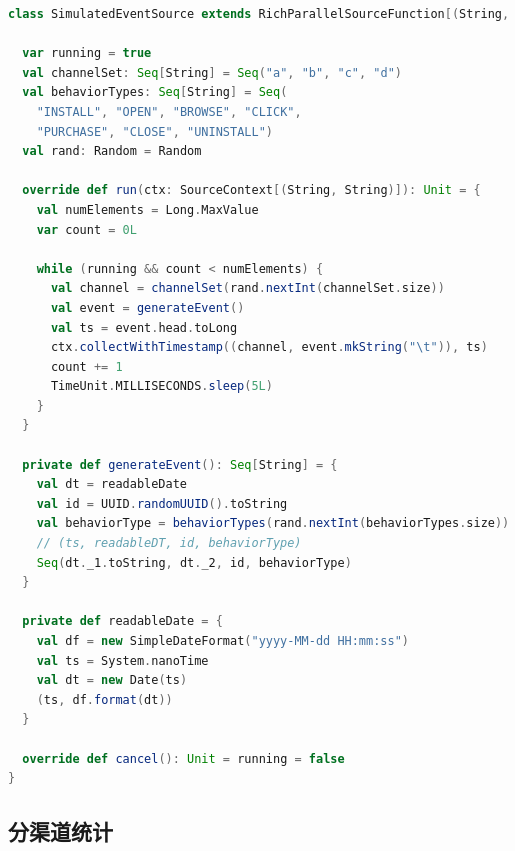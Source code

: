 \documentclass[oneside]{ctexbook}
\begin{document}
\begin{lstlisting}[language=scala]
class SimulatedEventSource extends RichParallelSourceFunction[(String, String)] {

  var running = true
  val channelSet: Seq[String] = Seq("a", "b", "c", "d")
  val behaviorTypes: Seq[String] = Seq(
    "INSTALL", "OPEN", "BROWSE", "CLICK",
    "PURCHASE", "CLOSE", "UNINSTALL")
  val rand: Random = Random

  override def run(ctx: SourceContext[(String, String)]): Unit = {
    val numElements = Long.MaxValue
    var count = 0L

    while (running && count < numElements) {
      val channel = channelSet(rand.nextInt(channelSet.size))
      val event = generateEvent()
      val ts = event.head.toLong
      ctx.collectWithTimestamp((channel, event.mkString("\t")), ts)
      count += 1
      TimeUnit.MILLISECONDS.sleep(5L)
    }
  }

  private def generateEvent(): Seq[String] = {
    val dt = readableDate
    val id = UUID.randomUUID().toString
    val behaviorType = behaviorTypes(rand.nextInt(behaviorTypes.size))
    // (ts, readableDT, id, behaviorType)
    Seq(dt._1.toString, dt._2, id, behaviorType)
  }

  private def readableDate = {
    val df = new SimpleDateFormat("yyyy-MM-dd HH:mm:ss")
    val ts = System.nanoTime
    val dt = new Date(ts)
    (ts, df.format(dt))
  }

  override def cancel(): Unit = running = false
}
\end{lstlisting}

\subsection{分渠道统计}
\end{document}
